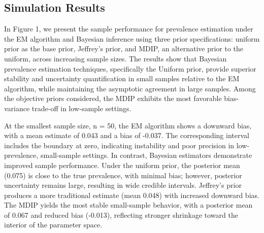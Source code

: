\documentclass[11pt]{article}
\begin{document}
\subsection{Simulation Results}

In Figure 1, we present the sample performance for prevalence estimation under the EM algorithm and Bayesian inference using three prior specifications: uniform prior as the base prior, Jeffrey’s prior, and MDIP, an alternative prior to the uniform, across increasing sample sizes. The results show that Bayesian prevalence estimation techniques, specifically the Uniform prior, provide superior stability and uncertainty quantification in small samples relative to the EM algorithm, while maintaining the asymptotic agreement in large samples. Among the objective priors considered, the MDIP exhibits the most favorable bias-variance trade-off in low-sample settings. 

At the smallest sample size, n = 50, the EM algorithm shows a downward bias, with a mean estimate of 0.043 and a bias of -0.037. The corresponding interval includes the boundary at zero, indicating instability and poor precision in low-prevalence, small-sample settings. In contrast, Bayesian estimators demonstrate improved sample performance. Under the uniform prior, the posterior mean (0.075) is close to the true prevalence, with minimal bias; however, posterior uncertainty remains large, resulting in wide credible intervals. Jeffrey's prior produces a more traditional estimate (mean 0.048) with increased downward bias. The MDIP yields the most stable small-sample behavior, with a posterior mean of 0.067 and reduced bias (-0.013), reflecting stronger shrinkage toward the interior of the parameter space. 
\end{document}
